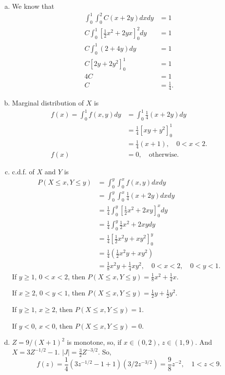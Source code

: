 \documentclass[14pt]{elegantbook}
\begin{document}
    \begin{solution}
        \begin{enumerate}[(a)]
            \item We know that 
            \begin{align*}
                \int_0^1\int_0^2C(x+2y)dx dy&=1\\
                C\int_0^1\left[\frac{1}{2}x^2+2yx\right]_0^2dy&=1\\
                C\int_0^1(2+4y)dy&=1\\
                C\left[2y+2y^2\right]_0^1&=1\\
                4C&=1\\
                C&=\frac{1}{4}.
            \end{align*}
            \item Marginal distribution of $X$ is
            \begin{align*}
                f(x)=\int_0^1f(x, y)dy&=\int_0^1\frac{1}{4}(x+2y)dy\\
                &=\frac{1}{4}\left[xy+y^2\right]_0^1\\
                &=\frac{1}{4}(x+1), \quad 0<x<2.\\
                f(x)&=0, \quad \text{otherwise.}
            \end{align*}
            \item c.d.f. of $X$ and $Y$ is
            \begin{align*}
                P(X\leq x, Y\leq y)&=\int_0^y\int_0^xf(x, y)dx dy\\
                &=\int_0^y\int_0^x\frac{1}{4}(x+2y)dx dy\\
                &=\frac{1}{4}\int_0^y\left[\frac{1}{2}x^2+2xy\right]_0^xdy\\
                &=\frac{1}{4}\int_0^y\frac{1}{2}x^2+2xydy\\
                &=\frac{1}{4}\left[\frac{1}{2}x^2y+xy^2\right]_0^y\\
                &=\frac{1}{4}\left(\frac{1}{2}x^2y+xy^2\right)\\
                &=\frac{1}{8}x^2y+\frac{1}{4}xy^2, \quad 0<x<2, \quad 0<y<1.
            \end{align*}
            If $y\geq1$, $0<x<2$, then $P(X\leq x, Y\leq y)=\frac{1}{8}x^2+\frac{1}{4}x$. 

            If $x\geq2$, $0<y<1$, then $P(X\leq x, Y\leq y)=\frac{1}{2}y+\frac{1}{2}y^2$. 

            If $y\geq1$, $x\geq2$, then $P(X\leq x, Y\leq y)=1$. 

            If $y<0$, $x<0$, then $P(X\leq x, Y\leq y)=0$. 
            \item $Z=9/(X+1)^2$ is monotone, so, if $x\in(0,2)$, $z\in(1,9)$. And $X=3Z^{-1/2}-1$. $|J|=\frac{3}{2}Z^{-3/2}$. So, 
            \[f(z)=\frac{1}{4}(3z^{-1/2}-1+1)\left(3/2z^{-3/2}\right)=\frac{9}{8}z^{-2}, \quad 1<z<9. \]
        \end{enumerate}
    \end{solution}
\end{document}
